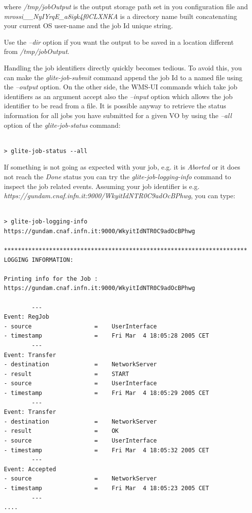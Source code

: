where \textit{/tmp/jobOutput} is the output storage path set in you configuration file and 
\textit{mrossi\_\_NyIYrqE\_a8igk4f0CLXNKA} is a directory name built concatenating your current OS user-name and
the job Id unique string. 

Use the \emph{--dir} option if you want the output to be saved in a location different from \textit{/tmp/jobOutput}.  

Handling the job identifiers directly quickly becomes tedious. To avoid this, you can make the \emph{glite-job-submit} 
command append the job Id to a named file using the \emph{--output} option. 
On the other side, the WMS-UI commands which take job identifiers as an argument accept also the \emph{--input} option 
which allows the job identifier to be read from a file.
It is possible anyway to retrieve the status information for all jobs you have submitted  for a given VO by using 
the \emph{--all} option of the  \emph{glite-job-status} command: 

\smallskip
\begin{scriptsize}
\begin{verbatim}

> glite-job-status --all 

\end{verbatim}
\end{scriptsize}
\smallskip


If something is not going as expected with your job, e.g. it is \textit{Aborted} or it does not reach the \textit{Done} 
status you can try the \emph{glite-job-logging-info} command to inspect the job related events. Assuming your job 
identifier is e.g. \textit{https://gundam.cnaf.infn.it:9000/WkyitIdNTR0C9adOcBPhwg}, you can type:

\smallskip
\begin{scriptsize}
\begin{verbatim}

> glite-job-logging-info https://gundam.cnaf.infn.it:9000/WkyitIdNTR0C9adOcBPhwg

**********************************************************************
LOGGING INFORMATION:

Printing info for the Job : https://gundam.cnaf.infn.it:9000/WkyitIdNTR0C9adOcBPhwg
 
        ---
Event: RegJob
- source                  =    UserInterface
- timestamp               =    Fri Mar  4 18:05:28 2005 CET
        ---
Event: Transfer
- destination             =    NetworkServer
- result                  =    START
- source                  =    UserInterface
- timestamp               =    Fri Mar  4 18:05:29 2005 CET
        ---
Event: Transfer
- destination             =    NetworkServer
- result                  =    OK
- source                  =    UserInterface
- timestamp               =    Fri Mar  4 18:05:32 2005 CET
        ---
Event: Accepted
- source                  =    NetworkServer
- timestamp               =    Fri Mar  4 18:05:23 2005 CET
        ---
....

\end{verbatim}
\end{scriptsize}
\smallskip

